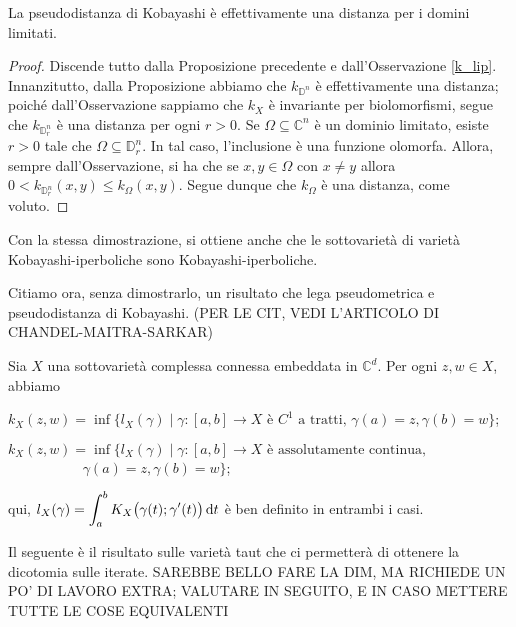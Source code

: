 \begin{cor}
    La pseudodistanza di Kobayashi è effettivamente una distanza per i domini limitati.
\end{cor}
\begin{proof}
    Discende tutto dalla Proposizione precedente e dall'Osservazione \ref{k_lip}. Innanzitutto, dalla Proposizione abbiamo che $k_{\mathbb{D}^n}$ è effettivamente una distanza; poiché dall'Osservazione sappiamo che $k_X$ è invariante per biolomorfismi, segue che $k_{\mathbb{D}_r^n}$ è una distanza per ogni $r>0$. Se $\Omega\subseteq\mathbb{C}^n$ è un dominio limitato, esiste $r>0$ tale che $\Omega\subseteq\mathbb{D}_r^n$. In tal caso, l'inclusione è una funzione olomorfa. Allora, sempre dall'Osservazione, si ha che se $x,y \in \Omega$ con $x\not=y$ allora $0<k_{\mathbb{D}_r^n}(x,y) \le k_{\Omega}(x,y)$. Segue dunque che $k_\Omega$ è una distanza, come voluto.
\end{proof}

\begin{oss}
    Con la stessa dimostrazione, si ottiene anche che le sottovarietà di varietà Kobayashi-iperboliche sono Kobayashi-iperboliche.
\end{oss}

Citiamo ora, senza dimostrarlo, un risultato che lega pseudometrica e pseudodistanza di Kobayashi. (PER LE CIT, VEDI L'ARTICOLO DI CHANDEL-MAITRA-SARKAR)

\begin{thm}
    Sia $X$ una sottovarietà complessa connessa embeddata in $\mathbb{C}^d$. Per ogni $z,w \in X$, abbiamo
    \begin{nlist}
        \item $k_X(z,w)=\inf\{l_X(\gamma) \mid \gamma:[a,b] \longrightarrow X\text{ è $C^1$ a tratti, }\gamma(a)=z,\gamma(b)=w\}$;
        \item $k_X(z,w)=\inf\{l_X(\gamma) \mid \gamma:[a,b] \longrightarrow X\text{ è assolutamente continua,}$\\
        $\text{    }\qquad\qquad\,\,\,\,\gamma(a)=z,\gamma(b)=w\}$;
    \end{nlist}
    qui, $l_X(\gamma)=\displaystyle\int_a^b K_X\big(\gamma(t);\gamma'(t)\big)\mathop{}\!\mathrm{d} t$ è ben definito in entrambi i casi.
\end{thm}

Il seguente è il risultato sulle varietà taut che ci permetterà di ottenere la dicotomia sulle iterate. SAREBBE BELLO FARE LA DIM, MA RICHIEDE UN PO' DI LAVORO EXTRA; VALUTARE IN SEGUITO, E IN CASO METTERE TUTTE LE COSE EQUIVALENTI

